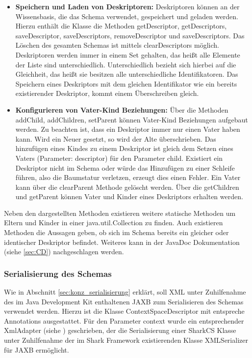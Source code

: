 \documentclass[a4paper]{article}
\begin{document}
	\newpage
	\begin{itemize}
		\item \textbf{Speichern und Laden von Deskriptoren:} Deskriptoren können
		an der Wissensbasis, die das Schema verwendet, gespeichert und
		geladen werden. Hierzu enthält die Klasse die Methoden getDescriptor,
		getDescriptors, saveDescriptor, saveDescriptors, removeDescriptor und
		saveDescriptors. Das Löschen des gesamten Schemas ist mittels 
		clearDescriptors möglich. Deskriptoren werden immer in einem Set gehalten,
		das heißt alle Elemente der Liste sind unterschiedlich. Unterschiedlich
		bezieht sich hierbei auf die Gleichheit, das heißt sie besitzen alle
		unterschiedliche Identifikatoren. Das Speichern eines Deskriptors mit dem
		gleichen Identifikator wie ein bereits existierender Deskriptor,
		kommt einem Überschreiben gleich.
		\item \textbf{Konfigurieren von Vater-Kind Beziehungen:} Über die Methoden 
		addChild, addChildren, setParent können Vater-Kind Beziehungen aufgebaut
		werden. Zu beachten ist, dass ein Deskriptor immer nur einen Vater
		haben kann. Wird ein Neuer gesetzt, so wird der Alte überschrieben. Das
		hinzufügen eines Kindes zu einem Deskriptor ist gleich dem Setzen eines 
		Vaters (Parameter: descriptor) für den Parameter child. Existiert ein
		Deskriptor nicht im Schema oder würde das Hinzufügen zu einer
		Schleife führen, also die Baumstatur verletzen, erzeugt dies einen
		Fehler.	Ein Vater kann über die clearParent Methode gelöscht werden. Über
		die getChildren	und getParent können Vater und Kinder eines Deskriptors
		erhalten werden.
	\end{itemize}
	
	Neben den dargestellten Methoden existieren weitere statische Methoden um Eltern
	und Kinder in einer java.util.Collection zu finden. Auch existieren Methoden die
	Aussagen geben, ob sich im Schema bereits ein gleicher oder identischer
	Deskriptor befindet. Weiteres kann in der JavaDoc Dokumentation 
	(siehe \autoref{sec:CD}) nachgeschlagen werden.
	
	\subsubsection{Serialisierung des Schemas}
	
	Wie in Abschnitt \ref{sec:konz_serialisierung} erklärt, soll XML unter
	Zuhilfenahme des im Java Development Kit enthaltenen JAXB zum Serialisieren
	des Schemas verwendet werden. Hierzu ist die Klasse ContextSpaceDescriptor
	mit entspreche Annotations ausgestattet. Für den Parameter context wurde
	ein entsprechender XmlAdapter (siehe \cite{XmlAdapter}) geschrieben, der
	die Serialisierung einer SharkCS Klasse unter Zuhilfenahme der im Shark
	Framework existierenden Klasse XMLSerializer für JAXB ermöglicht. \\
	
\end{document}
